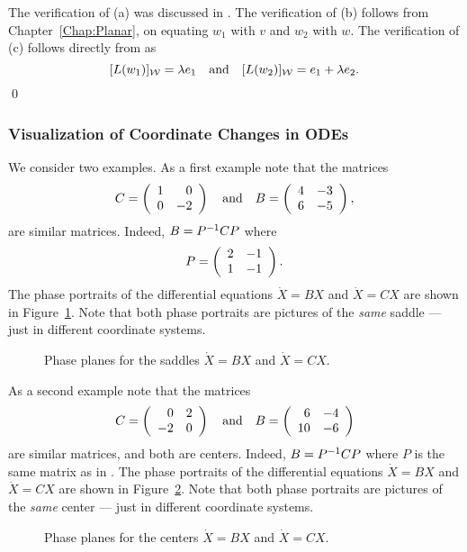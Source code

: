 \proof
The verification of (a) was discussed in .  The
verification of (b) follows from Chapter~\ref{Chap:Planar},
 on equating $w_1$ with $v$ and $w_2$ with $w$.
The verification of (c) follows directly from  as
\[
[L(w_1)]_{\cal W} = \lambda e_1 \quad\mbox{and}\quad [L(w_2)]_{\cal W} = e_1+\lambda e_2.
\]
\qed



\subsubsection*{Visualization of Coordinate Changes in ODEs}

We consider two examples.  As a first example note that the matrices
\[
C = \left(\begin{array}{rr} 1 & 0\\ 0 &-2\end{array}\right) \quad\mbox{and}\quad B = \left(\begin{array}{rr} 4 & -3\\ 6 &-5\end{array}\right),
\]
are similar matrices.   Indeed, $B = P^{-1} CP$ where
\begin{equation}  \label{e:Pchange}
P = \left(\begin{array}{rr} 2 & -1\\ 1 &-1\end{array}\right).
\end{equation}
The phase portraits of the differential equations $\dot{X}=BX$ and
$\dot{X}=CX$ are shown in Figure~\ref{F:comparesim}.  Note that both
phase portraits are pictures of the {\em same\/} saddle ---
just in different coordinate systems.

\begin{figure}[htb]
        \centerline{%
        }
        \caption{Phase planes for the saddles $\dot{X}=BX$ and $\dot{X}=CX$.}
        \label{F:comparesim}
\end{figure}

As a second example note that the matrices
\[
C = \left(\begin{array}{rr} 0 & 2\\ -2 &0\end{array}\right) \quad\mbox{and}\quad B = \left(\begin{array}{rr} 6 & -4\\ 10 &-6\end{array}\right)
\]
are similar matrices, and both are centers.   Indeed, $B = P^{-1} CP$
where $P$ is the same matrix as in .  The phase portraits
of the differential equations $\dot{X}=BX$ and $\dot{X}=CX$ are shown in
Figure~\ref{F:comparesim2}.  Note that both phase portraits are pictures
of the {\em same\/} center --- just in different coordinate
systems.



\begin{figure}[htb]
        \centerline{%
        }
        \caption{Phase planes for the centers $\dot{X}=BX$ and $\dot{X}=CX$.}
        \label{F:comparesim2}
\end{figure}






